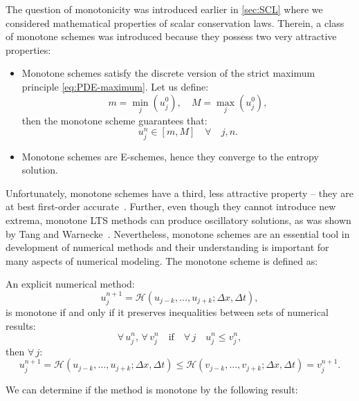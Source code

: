 The question of monotonicity was introduced earlier in \cref{sec:SCL} where we considered mathematical properties of scalar conservation laws. Therein, a class of monotone schemes was introduced because they possess two very attractive properties:
\begin{itemize}
\item Monotone schemes satisfy the discrete version of the strict maximum principle \eqref{eq:PDE-maximum}. Let us define:
\begin{equation}
m = \underset{j}{\min} (u_j^0 ), \quad M = \underset{j}{\max} (u_j^0),
\end{equation}
then the monotone scheme guarantees that:
\begin{equation} \label{eq:discrete-maximum}
u_j^n \in [m,M] \quad \forall \quad j,n.
\end{equation} 
\item Monotone schemes are E-schemes, hence they converge to the entropy solution.
\end{itemize}
Unfortunately, monotone schemes have a third, less attractive property -- they are at best first-order accurate~\cite{osh84}. Further, even though they cannot introduce new extrema, monotone LTS methods can produce oscillatory solutions, as was shown by Tang and Warnecke~\cite{tan04}. Nevertheless, monotone schemes are an essential tool in development of numerical methods and their understanding is important for many aspects of numerical modeling. The monotone scheme is defined as:
\begin{definition} \label{def:MS}
An explicit numerical method:
\begin{equation}
u_j^{n+1} = \mathcal{H} (u_{j-k}, \dots, u_{j+k}; \Delta x, \Delta t),
\end{equation}
is monotone if and only if it preserves inequalities between sets of numerical results:
\begin{equation}
\forall \, u_j^n, \, \forall \, v_j^n \quad
\text{if} \quad \forall \, j \quad
u_j^n \leq v_j^n,
\end{equation}
then $ \forall \, j $:
\begin{equation}
u_j^{n+1} = \mathcal{H} (u_{j-k}, \dots, u_{j+k}; \Delta x, \Delta t)
\leq
\mathcal{H} (v_{j-k}, \dots, v_{j+k}; \Delta x, \Delta t) = v_j^{n+1}.
\end{equation}
\end{definition}
We can determine if the method is monotone by the following result:
